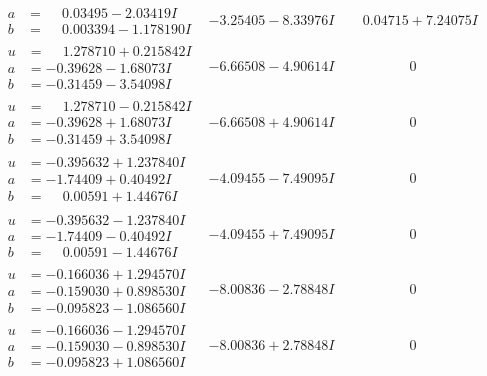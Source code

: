 \documentclass[1p]{elsarticle_modified}
\theoremstyle{definition}
\begin{document}
$$\begin{array}{c|c|c}
\begin{aligned}
a &= \phantom{-}0.03495 - 2.03419 I \\
b &= \phantom{-}0.003394 - 1.178190 I\end{aligned}
 & -3.25405 - 8.33976 I & \phantom{-}0.04715 + 7.24075 I \\ \hline\begin{aligned}
u &= \phantom{-}1.278710 + 0.215842 I \\
a &= -0.39628 - 1.68073 I \\
b &= -0.31459 - 3.54098 I\end{aligned}
 & -6.66508 - 4.90614 I & \phantom{-0.000000 } 0 \\ \hline\begin{aligned}
u &= \phantom{-}1.278710 - 0.215842 I \\
a &= -0.39628 + 1.68073 I \\
b &= -0.31459 + 3.54098 I\end{aligned}
 & -6.66508 + 4.90614 I & \phantom{-0.000000 } 0 \\ \hline\begin{aligned}
u &= -0.395632 + 1.237840 I \\
a &= -1.74409 + 0.40492 I \\
b &= \phantom{-}0.00591 + 1.44676 I\end{aligned}
 & -4.09455 - 7.49095 I & \phantom{-0.000000 } 0 \\ \hline\begin{aligned}
u &= -0.395632 - 1.237840 I \\
a &= -1.74409 - 0.40492 I \\
b &= \phantom{-}0.00591 - 1.44676 I\end{aligned}
 & -4.09455 + 7.49095 I & \phantom{-0.000000 } 0 \\ \hline\begin{aligned}
u &= -0.166036 + 1.294570 I \\
a &= -0.159030 + 0.898530 I \\
b &= -0.095823 - 1.086560 I\end{aligned}
 & -8.00836 - 2.78848 I & \phantom{-0.000000 } 0 \\ \hline\begin{aligned}
u &= -0.166036 - 1.294570 I \\
a &= -0.159030 - 0.898530 I \\
b &= -0.095823 + 1.086560 I\end{aligned}
 & -8.00836 + 2.78848 I & \phantom{-0.000000 } 0 \\ \hline\begin{aligned}

\end{aligned}
\end{array}$$
\end{document}
